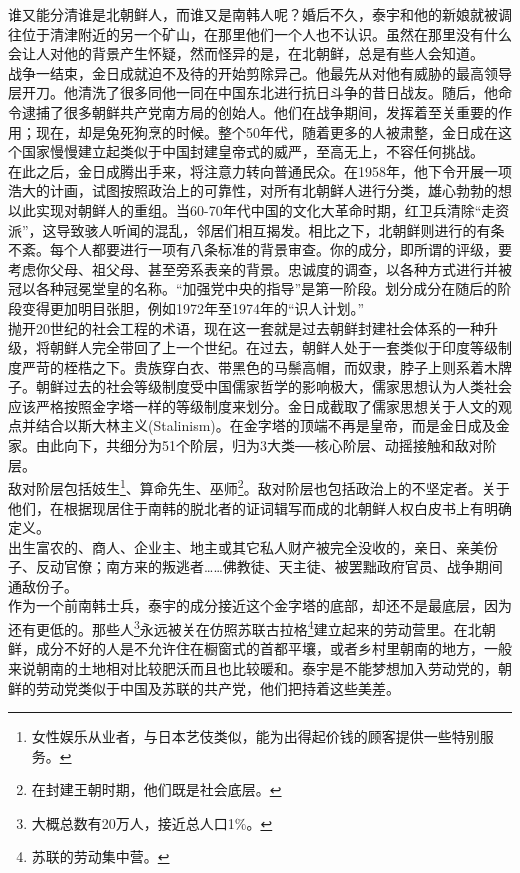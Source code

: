 谁又能分清谁是北朝鲜人，而谁又是南韩人呢？婚后不久，泰宇和他的新娘就被调往位于清津附近的另一个矿山，在那里他们一个人也不认识。虽然在那里没有什么会让人对他的背景产生怀疑，然而怪异的是，在北朝鲜，总是有些人会知道。\\

战争一结束，金日成就迫不及待的开始剪除异己。他最先从对他有威胁的最高领导层开刀。他清洗了很多同他一同在中国东北进行抗日斗争的昔日战友。随后，他命令逮捕了很多朝鲜共产党南方局的创始人。他们在战争期间，发挥着至关重要的作用；现在，却是兔死狗烹的时候。整个50年代，随着更多的人被肃整，金日成在这个国家慢慢建立起类似于中国封建皇帝式的威严，至高无上，不容任何挑战。\\

在此之后，金日成腾出手来，将注意力转向普通民众。在1958年，他下令开展一项浩大的计画，试图按照政治上的可靠性，对所有北朝鲜人进行分类，雄心勃勃的想以此实现对朝鲜人的重组。当60-70年代中国的文化大革命时期，红卫兵清除“走资派”，这导致骇人听闻的混乱，邻居们相互揭发。相比之下，北朝鲜则进行的有条不紊。每个人都要进行一项有八条标准的背景审查。你的成分，即所谓的评级，要考虑你父母、祖父母、甚至旁系表亲的背景。忠诚度的调查，以各种方式进行并被冠以各种冠冕堂皇的名称。“加强党中央的指导”是第一阶段。划分成分在随后的阶段变得更加明目张胆，例如1972年至1974年的“识人计划。”\\

抛开20世纪的社会工程的术语，现在这一套就是过去朝鲜封建社会体系的一种升级，将朝鲜人完全带回了上一个世纪。在过去，朝鲜人处于一套类似于印度等级制度严苛的桎梏之下。贵族穿白衣、带黑色的马鬃高帽，而奴隶，脖子上则系着木牌子。朝鲜过去的社会等级制度受中国儒家哲学的影响极大，儒家思想认为人类社会应该严格按照金字塔一样的等级制度来划分。金日成截取了儒家思想关于人文的观点并结合以斯大林主义(Stalinism)。在金字塔的顶端不再是皇帝，而是金日成及金家。由此向下，共细分为51个阶层，归为3大类──核心阶层、动摇接触和敌对阶层。\\

敌对阶层包括妓生\footnote{女性娱乐从业者，与日本艺伎类似，能为出得起价钱的顾客提供一些特别服务。}、算命先生、巫师\footnote{在封建王朝时期，他们既是社会底层。}。敌对阶层也包括政治上的不坚定者。关于他们，在根据现居住于南韩的脱北者的证词辑写而成的北朝鲜人权白皮书上有明确定义。\\

出生富农的、商人、企业主、地主或其它私人财产被完全没收的，亲日、亲美份子、反动官僚；南方来的叛逃者……佛教徒、天主徒、被罢黜政府官员、战争期间通敌份子。\\

作为一个前南韩士兵，泰宇的成分接近这个金字塔的底部，却还不是最底层，因为还有更低的。那些人\footnote{大概总数有20万人，接近总人口1\%。}永远被关在仿照苏联古拉格\footnote{苏联的劳动集中营。}建立起来的劳动营里。在北朝鲜，成分不好的人是不允许住在橱窗式的首都平壤，或者乡村里朝南的地方，一般来说朝南的土地相对比较肥沃而且也比较暖和。泰宇是不能梦想加入劳动党的，朝鲜的劳动党类似于中国及苏联的共产党，他们把持着这些美差。\\

